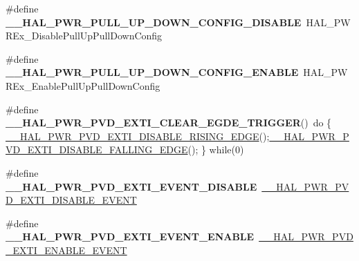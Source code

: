 \begin{DoxyCompactItemize}
\item 
\mbox{\label{group___h_a_l___p_w_r___aliased___macros_ga3ef24ab1c151291ee063911a00244e8d}} 
\#define {\bfseries \+\_\+\+\_\+\+H\+A\+L\+\_\+\+P\+W\+R\+\_\+\+P\+U\+L\+L\+\_\+\+U\+P\+\_\+\+D\+O\+W\+N\+\_\+\+C\+O\+N\+F\+I\+G\+\_\+\+D\+I\+S\+A\+B\+LE}~H\+A\+L\+\_\+\+P\+W\+R\+Ex\+\_\+\+Disable\+Pull\+Up\+Pull\+Down\+Config
\item 
\mbox{\label{group___h_a_l___p_w_r___aliased___macros_gadb15c53f7c44954ed13114d2a06310f8}} 
\#define {\bfseries \+\_\+\+\_\+\+H\+A\+L\+\_\+\+P\+W\+R\+\_\+\+P\+U\+L\+L\+\_\+\+U\+P\+\_\+\+D\+O\+W\+N\+\_\+\+C\+O\+N\+F\+I\+G\+\_\+\+E\+N\+A\+B\+LE}~H\+A\+L\+\_\+\+P\+W\+R\+Ex\+\_\+\+Enable\+Pull\+Up\+Pull\+Down\+Config
\item 
\mbox{\label{group___h_a_l___p_w_r___aliased___macros_ga288b776e260c65b683ae05a335f5826b}} 
\#define {\bfseries \+\_\+\+\_\+\+H\+A\+L\+\_\+\+P\+W\+R\+\_\+\+P\+V\+D\+\_\+\+E\+X\+T\+I\+\_\+\+C\+L\+E\+A\+R\+\_\+\+E\+G\+D\+E\+\_\+\+T\+R\+I\+G\+G\+ER}()~do \{ \mbox{\hyperlink{group___p_w_r___exported___macro_ga1ca8fd7f3286a176f6be540c75a004c6}{\+\_\+\+\_\+\+H\+A\+L\+\_\+\+P\+W\+R\+\_\+\+P\+V\+D\+\_\+\+E\+X\+T\+I\+\_\+\+D\+I\+S\+A\+B\+L\+E\+\_\+\+R\+I\+S\+I\+N\+G\+\_\+\+E\+D\+GE}}();\mbox{\hyperlink{group___p_w_r___exported___macro_ga1ca57168205f8cd8d1014e6eb9465f2d}{\+\_\+\+\_\+\+H\+A\+L\+\_\+\+P\+W\+R\+\_\+\+P\+V\+D\+\_\+\+E\+X\+T\+I\+\_\+\+D\+I\+S\+A\+B\+L\+E\+\_\+\+F\+A\+L\+L\+I\+N\+G\+\_\+\+E\+D\+GE}}(); \} while(0)
\item 
\mbox{\label{group___h_a_l___p_w_r___aliased___macros_ga42775d277d6bc8441d6e03a90a133f0b}} 
\#define {\bfseries \+\_\+\+\_\+\+H\+A\+L\+\_\+\+P\+W\+R\+\_\+\+P\+V\+D\+\_\+\+E\+X\+T\+I\+\_\+\+E\+V\+E\+N\+T\+\_\+\+D\+I\+S\+A\+B\+LE}~\mbox{\hyperlink{group___p_w_r___exported___macro_ga8bd379e960497722450c7cea474a7e7a}{\+\_\+\+\_\+\+H\+A\+L\+\_\+\+P\+W\+R\+\_\+\+P\+V\+D\+\_\+\+E\+X\+T\+I\+\_\+\+D\+I\+S\+A\+B\+L\+E\+\_\+\+E\+V\+E\+NT}}
\item 
\mbox{\label{group___h_a_l___p_w_r___aliased___macros_ga86b9e24e897c84a1441dc92c88435c00}} 
\#define {\bfseries \+\_\+\+\_\+\+H\+A\+L\+\_\+\+P\+W\+R\+\_\+\+P\+V\+D\+\_\+\+E\+X\+T\+I\+\_\+\+E\+V\+E\+N\+T\+\_\+\+E\+N\+A\+B\+LE}~\mbox{\hyperlink{group___p_w_r___exported___macro_gae5ba5672fe8cb7c1686c7f2cc211b128}{\+\_\+\+\_\+\+H\+A\+L\+\_\+\+P\+W\+R\+\_\+\+P\+V\+D\+\_\+\+E\+X\+T\+I\+\_\+\+E\+N\+A\+B\+L\+E\+\_\+\+E\+V\+E\+NT}}

\end{DoxyCompactItemize}
